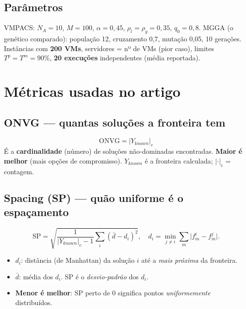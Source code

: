 \documentclass[11pt]{article}
\newcommand{\var}[1]{\textcolor{azul}{$#1$}}
\begin{document}
\subsection{Parâmetros}
VMPACS: $N_A=10$, $M=100$, $\alpha=0{,}45$, $\rho_l=\rho_g=0{,}35$, $q_0=0{,}8$.
MGGA (o genético comparado): população 12, cruzamento 0{,}7, mutação 0{,}05, 10
gerações. Instâncias com \textbf{200 VMs}, servidores = nº de VMs (pior caso),
limites $T^p=T^m=90\%$, \textbf{20 execuções} independentes (média reportada).

\section{Métricas usadas no artigo}
\subsection{ONVG --- quantas soluções a fronteira tem}
\[
\text{ONVG}=|Y_{known}|_c
\]
É a \textbf{cardinalidade} (número) de soluções não-dominadas encontradas.
\textbf{Maior é melhor} (mais opções de compromisso). \var{Y_{known}} é a
fronteira calculada; \var{|\cdot|_c} = contagem.

\subsection{Spacing (SP) --- quão uniforme é o espaçamento}
\[
\text{SP}=\sqrt{\frac{1}{|Y_{known}|_c-1}\sum_{i}(\bar{d}-d_i)^2},\quad
d_i=\min_{j\ne i}\sum_{m}\big|f^i_m-f^j_m\big|.
\]
\begin{itemize}[leftmargin=1.4em,itemsep=1pt]
  \item \var{d_i}: distância (de Manhattan) da solução $i$ até a \emph{mais
  próxima} da fronteira.
  \item \var{\bar{d}}: média dos $d_i$. SP é o \emph{desvio-padrão} dos $d_i$.
  \item \textbf{Menor é melhor}: SP perto de 0 significa pontos
  \emph{uniformemente} distribuídos.
\end{itemize}

\end{document}
